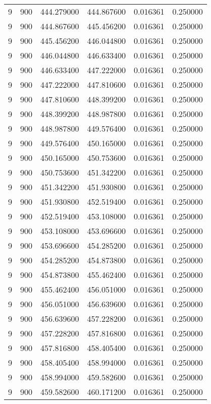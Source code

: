 \begin{longtable}{rrrrrr}
9 & 900 & 444.279000 & 444.867600 & 0.016361 & 0.250000 \\
9 & 900 & 444.867600 & 445.456200 & 0.016361 & 0.250000 \\
9 & 900 & 445.456200 & 446.044800 & 0.016361 & 0.250000 \\
9 & 900 & 446.044800 & 446.633400 & 0.016361 & 0.250000 \\
9 & 900 & 446.633400 & 447.222000 & 0.016361 & 0.250000 \\
9 & 900 & 447.222000 & 447.810600 & 0.016361 & 0.250000 \\
9 & 900 & 447.810600 & 448.399200 & 0.016361 & 0.250000 \\
9 & 900 & 448.399200 & 448.987800 & 0.016361 & 0.250000 \\
9 & 900 & 448.987800 & 449.576400 & 0.016361 & 0.250000 \\
9 & 900 & 449.576400 & 450.165000 & 0.016361 & 0.250000 \\
9 & 900 & 450.165000 & 450.753600 & 0.016361 & 0.250000 \\
9 & 900 & 450.753600 & 451.342200 & 0.016361 & 0.250000 \\
9 & 900 & 451.342200 & 451.930800 & 0.016361 & 0.250000 \\
9 & 900 & 451.930800 & 452.519400 & 0.016361 & 0.250000 \\
9 & 900 & 452.519400 & 453.108000 & 0.016361 & 0.250000 \\
9 & 900 & 453.108000 & 453.696600 & 0.016361 & 0.250000 \\
9 & 900 & 453.696600 & 454.285200 & 0.016361 & 0.250000 \\
9 & 900 & 454.285200 & 454.873800 & 0.016361 & 0.250000 \\
9 & 900 & 454.873800 & 455.462400 & 0.016361 & 0.250000 \\
9 & 900 & 455.462400 & 456.051000 & 0.016361 & 0.250000 \\
9 & 900 & 456.051000 & 456.639600 & 0.016361 & 0.250000 \\
9 & 900 & 456.639600 & 457.228200 & 0.016361 & 0.250000 \\
9 & 900 & 457.228200 & 457.816800 & 0.016361 & 0.250000 \\
9 & 900 & 457.816800 & 458.405400 & 0.016361 & 0.250000 \\
9 & 900 & 458.405400 & 458.994000 & 0.016361 & 0.250000 \\
9 & 900 & 458.994000 & 459.582600 & 0.016361 & 0.250000 \\
9 & 900 & 459.582600 & 460.171200 & 0.016361 & 0.250000 \\

\end{longtable}
